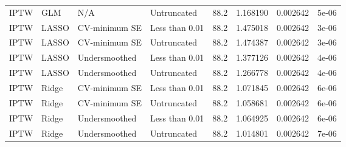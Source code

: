 \begin{longtable}[l]{llllllll}
IPTW & GLM & N/A & Untruncated & 88.2 & 1.168190 & 0.002642 & 5e-06\\
IPTW & LASSO & CV-minimum SE & Less than 0.01 & 88.2 & 1.475018 & 0.002642 & 3e-06\\
IPTW & LASSO & CV-minimum SE & Untruncated & 88.2 & 1.474387 & 0.002642 & 3e-06\\
IPTW & LASSO & Undersmoothed & Less than 0.01 & 88.2 & 1.377126 & 0.002642 & 4e-06\\
IPTW & LASSO & Undersmoothed & Untruncated & 88.2 & 1.266778 & 0.002642 & 4e-06\\
IPTW & Ridge & CV-minimum SE & Less than 0.01 & 88.2 & 1.071845 & 0.002642 & 6e-06\\
IPTW & Ridge & CV-minimum SE & Untruncated & 88.2 & 1.058681 & 0.002642 & 6e-06\\
IPTW & Ridge & Undersmoothed & Less than 0.01 & 88.2 & 1.064925 & 0.002642 & 6e-06\\
IPTW & Ridge & Undersmoothed & Untruncated & 88.2 & 1.014801 & 0.002642 & 7e-06\\
\bottomrule
\end{longtable}
